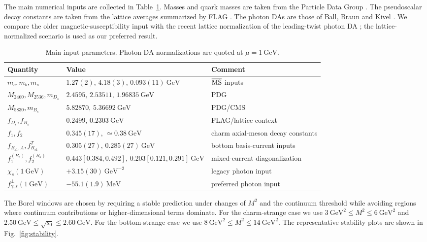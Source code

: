 \documentclass[aps,prd,preprint,nofootinbib,superscriptaddress]{revtex4-2}
\newcommand{\Ds}{D_s}
\newcommand{\Bs}{B_s}
\newcommand{\Bsone}{B_{s1}}
\newcommand{\GeV}{\mathrm{GeV}}
\newcommand{\MeV}{\mathrm{MeV}}
\begin{document}
The main numerical inputs are collected in Table~\ref{tab:inputs}.  Masses and
quark masses are taken from the Particle Data Group \cite{ParticleDataGroup:2024cfk}.
The pseudoscalar decay constants are taken from the lattice averages summarized
by FLAG \cite{FlavourLatticeAveragingGroupFLAG:2024oxs}.  The photon DAs are
those of Ball, Braun and Kivel \cite{Ball:2002ps}.  We compare the older
magnetic-susceptibility input \cite{Rohrwild:2007yt} with the recent lattice
normalization of the leading-twist photon DA \cite{Bacchio:2024pij}; the
lattice-normalized scenario is used as our preferred result.

\begin{table}[t]
\caption{Main input parameters.  Photon-DA normalizations are quoted at
$\mu=1~\GeV$.}
\label{tab:inputs}
\begin{ruledtabular}
\begin{tabular}{lll}
Quantity & Value & Comment \\
\hline
$m_c,m_b,m_s$ & $1.27(2),\,4.18(3),\,0.093(11)~\GeV$ & $\overline{\rm MS}$ inputs \\
$M_{2460},M_{2536},m_{\Ds}$ & $2.4595,\,2.53511,\,1.96835~\GeV$ & PDG \\
$M_{5830},m_{\Bs}$ & $5.82870,\,5.36692~\GeV$ & PDG/CMS \\
$f_{\Ds},f_{\Bs}$ & $0.2499,\,0.2303~\GeV$ & FLAG/lattice context \\
$f_1,f_2$ & $0.345(17),\,\simeq0.38~\GeV$ & charm axial-meson decay constants \\
$f_{\Bsone,A},f_{\Bsone}^{T}$ & $0.305(27),\,0.285(27)~\GeV$ & bottom basis-current inputs \\
$f_1^{(B_s)},f_2^{(B_s)}$ & $0.443[0.384,0.492],\,0.203[0.121,0.291]~\GeV$ & mixed-current diagonalization \\
$\chi_s(1~\GeV)$ & $+3.15(30)~\GeV^{-2}$ & legacy photon input \\
$f_{\gamma,s}^{\perp}(1~\GeV)$ & $-55.1(1.9)~\MeV$ & preferred photon input \\
\end{tabular}
\end{ruledtabular}
\end{table}

The Borel windows are chosen by requiring a stable prediction under changes of
$M^2$ and the continuum threshold while avoiding regions where continuum
contributions or higher-dimensional terms dominate.  For the charm-strange
case we use $3~\GeV^2\leq M^2\leq6~\GeV^2$ and
$2.50~\GeV\leq\sqrt{s_0}\leq2.60~\GeV$.  For the bottom-strange case we use
$8~\GeV^2\leq M^2\leq14~\GeV^2$.  The representative stability plots are shown
in Fig.~\ref{fig:stability}.
\end{document}
